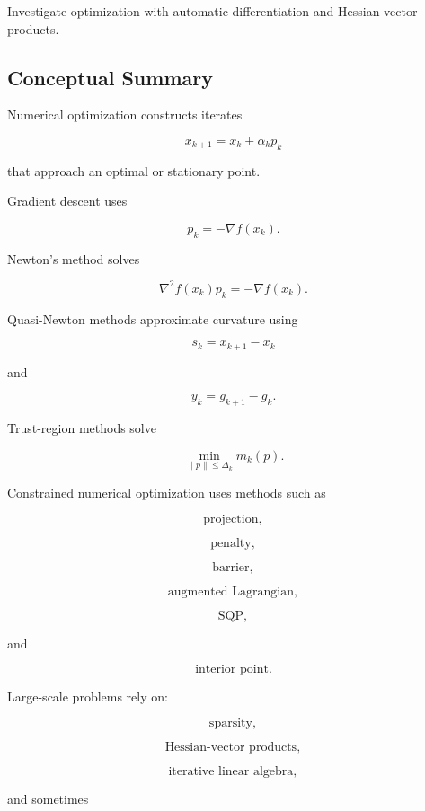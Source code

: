 \begin{exercise}[4]
Investigate optimization with automatic differentiation and
Hessian-vector products.
\end{exercise}

\subsection{Conceptual Summary}
\label{subsec:numerical-optimization-summary}

Numerical optimization constructs iterates

\[
\boxed{
x_{k+1}
=
x_k+\alpha_kp_k
}
\]

that approach an optimal or stationary point.

Gradient descent uses

\[
\boxed{
p_k
=
-\nabla f(x_k).
}
\]

Newton's method solves

\[
\boxed{
\nabla^2f(x_k)p_k
=
-\nabla f(x_k).
}
\]

Quasi-Newton methods approximate curvature using

\[
\boxed{
s_k
=
x_{k+1}-x_k
}
\]

and

\[
\boxed{
y_k
=
g_{k+1}-g_k.
}
\]

Trust-region methods solve

\[
\boxed{
\min_{\|p\|\leq\Delta_k}
m_k(p).
}
\]

Constrained numerical optimization uses methods such as

\[
\boxed{
\text{projection},
}
\]

\[
\boxed{
\text{penalty},
}
\]

\[
\boxed{
\text{barrier},
}
\]

\[
\boxed{
\text{augmented Lagrangian},
}
\]

\[
\boxed{
\text{SQP},
}
\]

and

\[
\boxed{
\text{interior point}.
}
\]

Large-scale problems rely on:

\[
\boxed{
\text{sparsity},
}
\]

\[
\boxed{
\text{Hessian-vector products},
}
\]

\[
\boxed{
\text{iterative linear algebra},
}
\]

and sometimes

